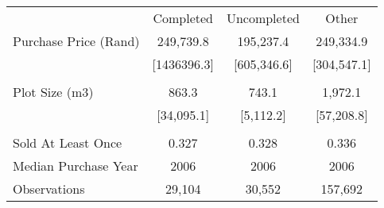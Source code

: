 \begin{tabu}{lccc}
\toprule
 & Completed & Uncompleted & Other  \\
 Purchase Price (Rand)  & 249,739.8  & 195,237.4  & 249,334.9  \\ 
\rowfont{\footnotesize} & [1436396.3]  & [605,346.6]  & [304,547.1]  \\ 
 &  &  &  \\ 
 Plot Size (m3)  & 863.3  & 743.1  & 1,972.1  \\ 
\rowfont{\footnotesize} & [34,095.1]  & [5,112.2]  & [57,208.8]  \\ 
 &  &  &  \\ 
 Sold At Least Once  & 0.327  & 0.328  & 0.336  \\ 
 Median Purchase Year  & 2006  & 2006  & 2006  \\ 
\midrule
 Observations  & 29,104  & 30,552  & 157,692  \\ 
\bottomrule
\end{tabu}
